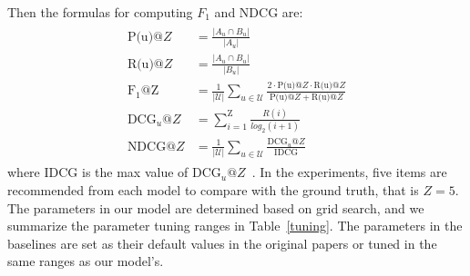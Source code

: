 \documentclass[conference]{IEEEtran}
\theoremstyle{definition}
\theoremstyle{theorem}
\theoremstyle{proof}
\theoremstyle{remark}
\begin{document}
Then the formulas for computing $F_1$ and NDCG are:
\begin{eqnarray}
\begin{aligned}
\text{P(u)}@{Z} &= \frac{\left| A_{u}\cap B_{u} \right|}{\left| A_{u} \right|}\\
\text{R(u)}@{Z} &= \frac{\left| A_{u}\cap B_{u} \right|}{\left| B_{u} \right|}\\
\mathrm {F_1@Z} &= \frac{1}{|\mathcal{U}|}\sum_{u \in \mathcal{U}}\frac{2\cdot \text{P(u)}@{Z}\cdot \text{R(u)}@{Z}} {\text{P(u)}@{Z} + \text{R(u)}@{Z}} \\
\text{DCG}_u@{Z} & = \sum_{i=1}^{\text{Z}}{\frac{R(i)}{log_2(i+1)}} \\
\text{NDCG}@{Z}  & = \frac{1}{|\mathcal{U}|} \sum_{u\in \mathcal{U}}\frac{\text{DCG}_u@Z} {\text{IDCG}}
\nonumber
\end{aligned}
\end{eqnarray}
where IDCG is the max value of $\text{DCG}_u@{Z}$~\cite{buckland1994relationship}.
In the experiments, five items are recommended from each model to compare with the ground truth, that is $Z=5$.
The parameters in our model are determined based on grid search, and we summarize the parameter tuning ranges in Table~\ref{tuning}.
The parameters in the baselines are set as their default values in the original papers or tuned in the same ranges as our model's.


\begin{table}[t]
	\centering
	\caption{{The tuning ranges of our model parameters.}}
	\vspace{-0.cm}
	\renewcommand\arraystretch{1.3}
	\label{tuning}
	\vspace{-0.cm}
\end{table}
\end{document}
